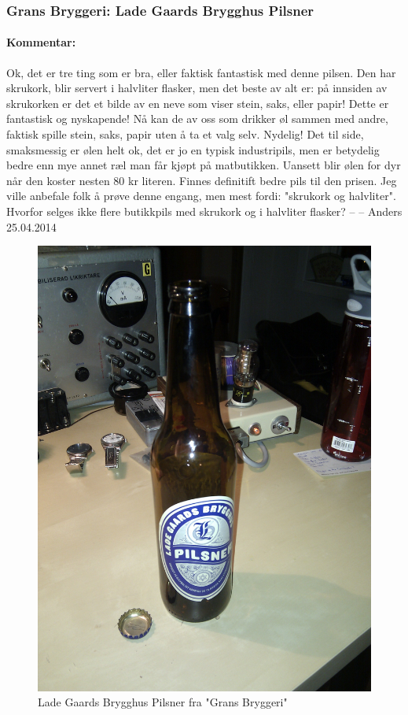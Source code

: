 \documentclass[12pt,a4paper,oneside,norsk]{article}
\begin{document}
\newpage
\subsubsection{Grans Bryggeri: Lade Gaards Brygghus Pilsner}
\paragraph{Kommentar:}Ok, det er tre ting som er bra, eller faktisk fantastisk med denne pilsen. Den har skrukork, blir servert i halvliter flasker, men det beste av alt er: på innsiden av skrukorken er det et bilde av en neve som viser stein, saks, eller papir! Dette er fantastisk og nyskapende! Nå kan de av oss som drikker øl sammen med andre, faktisk spille stein, saks, papir uten å ta et valg selv. Nydelig! Det til side, smaksmessig er ølen helt ok, det er jo en typisk industripils, men er betydelig bedre enn mye annet ræl man får kjøpt på matbutikken. Uansett blir ølen for dyr når den koster nesten 80 kr literen. Finnes definitift bedre pils til den prisen. Jeg ville anbefale folk å prøve denne engang, men mest fordi: "skrukork og halvliter". Hvorfor selges ikke flere butikkpils med skrukork og i halvliter flasker?
\newline
-- -- Anders 25.04.2014

\begin{figure} [H]
\centering
\includegraphics[scale=0.1, angle=0]{Bilder/Ol/ladeGaardPils.jpg}
\caption{Lade Gaards Brygghus Pilsner fra "Grans Bryggeri"}
\end{figure}
\end{document}
